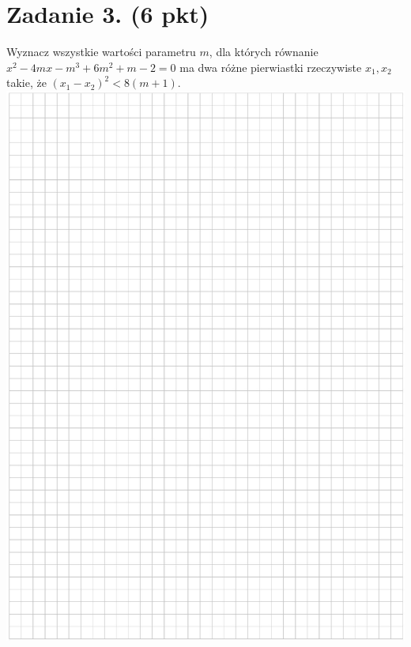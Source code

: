 \documentclass[10pt]{article}
\begin{document}
\section*{Zadanie 3. (6 pkt)}
Wyznacz wszystkie wartości parametru \(m\), dla których równanie \(x^{2}-4 m x-m^{3}+6 m^{2}+m-2=0\) ma dwa różne pierwiastki rzeczywiste \(x_{1}, x_{2}\) takie, że \(\left(x_{1}-x_{2}\right)^{2}<8(m+1)\).\\
\includegraphics[max width=\textwidth, center]{2024_11_21_b36d8cbb94edb763da2cg-04}\\
\end{document}
